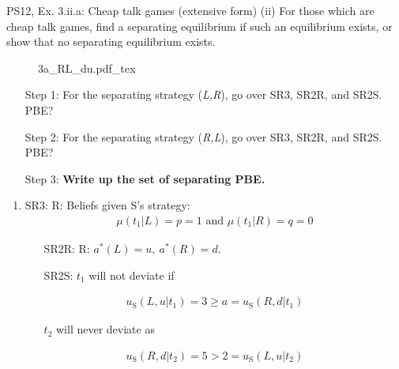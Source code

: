 \begin{frame}{PS12, Ex. 3.ii.a: Cheap talk games (extensive form)}
    (ii) For those which are cheap talk games, find a separating equilibrium if such an equilibrium exists, or show that no separating equilibrium exists.\vspace{-6pt}
    \begin{multicols}{2}
      \begin{figure}[!h]
        \center{}
        {3a_RL_du.pdf_tex}
      \end{figure}\vspace{-6pt}
      \begin{itemize}
        \item[Step 1:] For the separating strategy (\textit{L,R}), go over SR3, SR2R, and SR2S. PBE?
        \item[Step 2:] For the separating strategy (\textit{R,L}), go over SR3, SR2R, and SR2S. PBE?
        \item[Step 3:] \textbf{Write up the set of separating PBE.}
      \end{itemize}
      \vfill\null\columnbreak
      \begin{enumerate}
        \item SR3: R: Beliefs given S's strategy:\vspace{-8pt}
        \begin{align*}
          \mu(t_1|L)=p=1\text{ and }\mu(t_1|R)=q=0
        \end{align*}\vspace{-18pt}
        \begin{itemize}\normalsize
          \item[SR2R:] R: $a^*(L)=u,\ a^*(R)=d$.
          \item[SR2S:] $t_1$ will not deviate if
        \end{itemize}\vspace{-10pt}
        \begin{align*}
          u_\text{S}(L,u|t_1)=3\geq a=u_\text{S}(R,d|t_1)
        \end{align*}\vspace{-18pt}
        \begin{itemize}\normalsize
          \item[] $t_2$ will never deviate as
        \end{itemize}\vspace{-10pt}
        \begin{align*}
          u_\text{S}(R,d|t_2)=5>2=u_\text{S}(L,u|t_2)

\end{align*}
\end{enumerate}
\end{multicols}
\end{frame}
